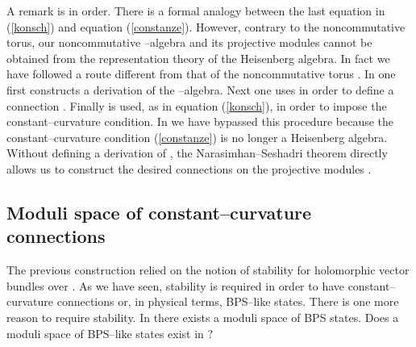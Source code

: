\documentclass[a4paper,a4paper]{article}
\begin{document}
A remark is in order. There is a formal analogy between the last equation 
in (\ref{konsch}) and equation (\ref{constanze}). However, contrary to the 
noncommutative torus, our noncommutative \coordHE{}--algebra \coordHE{} 
and its projective modules cannot be obtained from the representation theory 
of the Heisenberg algebra. In fact we have followed a route different 
from that of the noncommutative torus \cite{SCHWARZ}. In \coordHE{} one first 
constructs a derivation \myHighlight{$\delta$}\coordHE{} of the \coordHE{}--algebra. 
Next one uses \myHighlight{$\delta$}\coordHE{} in order to define a connection \myHighlight{$\nabla$}\coordHE{}. 
Finally \myHighlight{$\nabla$}\coordHE{} is used, as in equation (\ref{konsch}), in order to 
impose the constant--curvature condition. In \coordHE{} we have bypassed this
procedure because the constant--curvature condition (\ref{constanze}) 
is no longer a Heisenberg algebra. Without defining a derivation \myHighlight{$\delta$}\coordHE{}
of \coordHE{}, the Narasimhan--Seshadri theorem directly 
allows us to construct the desired connections on the projective modules 
\coordHE{}.

\subsection{Moduli space of constant--curvature connections}\label{xyz}  
  
The previous construction relied on the notion of stability for 
holomorphic vector bundles over \myHighlight{$\Sigma$}\coordHE{}. As we have seen, stability is 
required in order to have constant--curvature connections or, in physical 
terms, BPS--like states. There is one more reason to require stability.
In \coordHE{} there exists a moduli space of BPS states. Does a moduli space 
of BPS--like states exist in \coordHE{}?
  
\end{document}
